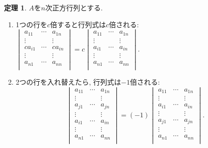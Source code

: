 \documentclass[dvipdfmx,a4paper,11pt]{article}
\theoremstyle{definition}
\newtheorem{thm}{定理}
\begin{document}
 
 \begin{tcolorbox}[
    colback = white,
    colframe = green!35!black,
    fonttitle = \bfseries,
    breakable = true]
    \begin{thm}
   \label{determinant}
$A$を$n$次正方行列とする.
\begin{enumerate}

\item  1つの行を$c$倍すると行列式は$c$倍される:
$
\begin{vmatrix}
a_{11}&  \cdots &a_{1n} \\
\vdots&	 	  &	\vdots \\
ca_{i1} & \cdots &ca_{in} \\
\vdots& 		   &	\vdots \\
a_{n1}	& \cdots &a_{nn} \\
\end{vmatrix}
=
c
\begin{vmatrix}
a_{11}&  \cdots &a_{1n} \\
\vdots&	 	  &	\vdots \\
a_{i1} & \cdots & a_{in} \\
\vdots& 		   &	\vdots \\
a_{n1}	& \cdots &a_{nn} \\
\end{vmatrix}
$.
\item 2つの行を入れ替えたら, 行列式は$-1$倍される:
$$
\begin{vmatrix}
a_{11}&  \cdots &a_{1n} \\
\vdots& 		   &	\vdots \\
a_{j1} & \cdots & a_{jn} \\
\vdots&	 	  &	\vdots \\
a_{i1} & \cdots & a_{in} \\
\vdots& 		   &	\vdots \\
a_{n1}	& \cdots &a_{nn} \\
\end{vmatrix}
= (-1)
\begin{vmatrix}
a_{11}&  \cdots &a_{1n} \\
\vdots&	 	  &	\vdots \\
a_{i1} & \cdots & a_{in} \\
\vdots& 		   &	\vdots \\
a_{j1} & \cdots & a_{jn} \\
\vdots& 		   &	\vdots \\
a_{n1}	& \cdots &a_{nn} \\
\end{vmatrix}.
$$

\end{enumerate}
\end{thm}
\end{tcolorbox}
\end{document}
